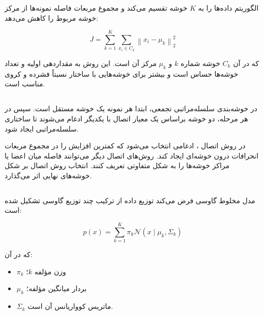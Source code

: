 الگوریتم
داده‌ها را به $K$ خوشه تقسیم می‌کند و مجموع مربعات فاصله نمونه‌ها از مرکز خوشه مربوط را کاهش می‌دهد:

\begin{equation}
J
=
\sum_{k=1}^{K}
\sum_{x_i\in C_k}
\left\|x_i-\mu_k\right\|_2^2
\end{equation}

که در آن $C_k$ خوشه شماره $k$ و $\mu_k$ مرکز آن است. این روش به مقداردهی اولیه و تعداد خوشه‌ها حساس است و بیشتر برای خوشه‌هایی با ساختار نسبتاً فشرده و کروی مناسب است.


\subsection{}

در خوشه‌بندی سلسله‌مراتبی تجمعی، ابتدا هر نمونه یک خوشه مستقل است. سپس در هر مرحله، دو خوشه براساس یک معیار اتصال با یکدیگر ادغام می‌شوند تا ساختاری سلسله‌مراتبی ایجاد شود.

در روش اتصال
،
ادغامی انتخاب می‌شود که کمترین افزایش را در مجموع مربعات انحرافات درون خوشه‌ای ایجاد کند. روش‌های اتصال دیگر می‌توانند فاصله میان اعضا یا مراکز خوشه‌ها را به شکل متفاوتی تعریف کنند. انتخاب روش اتصال بر شکل خوشه‌های نهایی اثر می‌گذارد.


\subsection{}

مدل مخلوط گاوسی فرض می‌کند توزیع داده از ترکیب چند توزیع گاوسی تشکیل شده است:

\begin{equation}
p(x)
=
\sum_{k=1}^{K}
\pi_k
\mathcal{N}(x\mid\mu_k,\Sigma_k)
\end{equation}

که در آن:

\begin{itemize}

	\item $\pi_k$ وزن مؤلفه $k$؛

	\item $\mu_k$ بردار میانگین مؤلفه؛

	\item $\Sigma_k$ ماتریس کوواریانس آن است.

\end{itemize}

